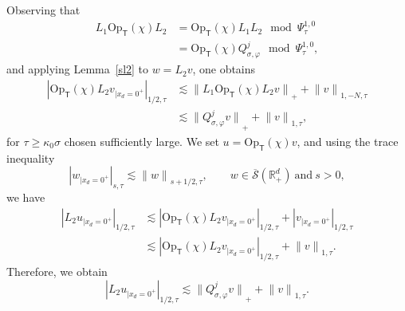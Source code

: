 \documentclass[JEP,XML,SOM,Unicode,published]{cedram}
\theoremstyle{plain}
\theoremstyle{definition}
\def\R{\mathbb{R}}
\newcommand{\suff}{sufficiently\xspace}
\let\k\kappa
\newcommand{\br}{\ensuremath{_{|x_d=0^+}}}
\newcommand{\Opt}{\ensuremath{\mathrm{Op}_{\scriptscriptstyle{\mathsf{T}}}}}
\newcommand{\Norm}[2]{{\| #1 \|}_{#2}}
\newcommand{\Normsc}[2]{{\| #1 \|}_{#2, \tau}}
\newcommand{\normsc}[2]{{| #1 |}_{#2, \tau}}
\newcommand{\Psisc}{\Psi_\tau}
\newcommand{\Qconj}{Q_{\sigma,\varphi}}
\newcommand{\Sbarp}{\ensuremath{\overline{\mathscr{S}}(\Rdp)}}
\newcommand{\Rdp}{\R^d_+}
\begin{document}
Observing that
\begin{align*}
L_1 \Opt(\chi)L_2 &=\Opt(\chi)L_1 L_2 \mod \Psisc^{1,0}\\
&= \Opt(\chi)\Qconj^j \mod \Psisc^{1,0},
\end{align*}
and applying Lemma~\ref{sl2} to $w=L_2 v$, one obtains
\begin{align*}
\normsc{\Opt(\chi) L_2 v\br}{1/2}
&\lesssim \Norm{L_1 \Opt(\chi) L_2 v}{+}
+\Normsc{v}{1,-N}\\
&\lesssim \Norm{\Qconj^jv}{+}
+\Normsc{v}{1},
\end{align*}
for $\tau \geq \k_0 \sigma$ chosen \suff large.
We set $u=\Opt(\chi)v$, and using the trace inequality
\begin{equation*}
\normsc{w\br}{s}\lesssim \Normsc{w}{s+1/2},
\qquad w\in
\Sbarp \ \text{and} \ s>0,
\end{equation*}
we have
\begin{align*}
\normsc{L_2 u\br}{1/2}
&\lesssim \normsc{\Opt(\chi)L_2 v\br}{1/2}+\normsc{v\br}{1/2}\\
&\lesssim \normsc{\Opt(\chi)L_2 v\br}{1/2} + \Normsc{v}{1}.
\end{align*}
Therefore, we obtain
\begin{equation*}
\normsc{L_2 u\br}{1/2}
\lesssim \Norm{\Qconj^jv}{+}
+\Normsc{v}{1}.
\end{equation*}
\end{document}
